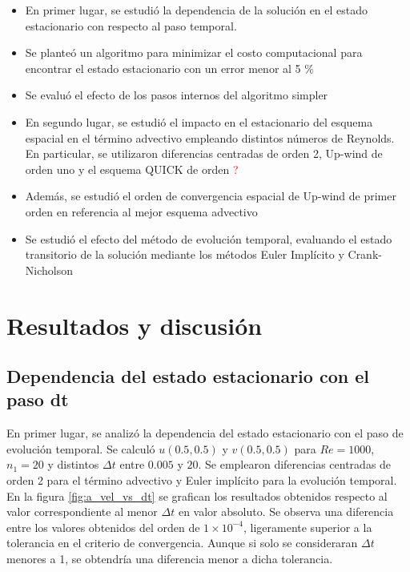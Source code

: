 \documentclass[aps,prb,twocolumn,superscriptaddress,floatfix,longbibliography,10pt]{revtex4-2}
\newif\ifptitle
\newif\ifpnumber
\newcounter{para}
\newcommand\ptitle[1]{\par\refstepcounter{para}
{\ifpnumber{\noindent\textcolor{lightgray}{\textbf{\thepara}}\indent}\fi}
{\ifptitle{\textbf{[{#1}]}}\fi}}
\begin{document}
\ptitle{Resumen de lo que se va a estudiar}
\begin{itemize}
  \item En primer lugar, se estudió la dependencia de la solución en el estado estacionario con respecto al paso temporal.
  \item Se planteó un algoritmo para minimizar el costo computacional para encontrar el estado estacionario con un error menor al 5 \%
  \item Se evaluó el efecto de los pasos internos del algoritmo simpler
  \item En segundo lugar, se estudió el impacto en el estacionario del esquema espacial en el término advectivo empleando distintos números de Reynolds. En particular, se utilizaron diferencias centradas de orden 2, Up-wind de orden uno y el esquema QUICK de orden \textcolor{red}{?}
  \item Además, se estudió el orden de convergencia espacial de Up-wind de primer orden en referencia al mejor esquema advectivo
  \item Se estudió el efecto del método de evolución temporal, evaluando el estado transitorio de la solución mediante los métodos Euler Implícito y Crank-Nicholson
\end{itemize}



\section{Resultados y discusión}


\subsection{Dependencia del estado estacionario con el paso dt}

En primer lugar, se analizó la dependencia del estado estacionario con el paso de evolución temporal. Se calculó $u(0.5,0.5)$ y $v(0.5,0.5)$ para $Re = 1000$, $n_1 = 20$ y distintos $\Delta t$ entre $0.005$ y $20$. Se emplearon diferencias centradas de orden 2 para el término advectivo y Euler implícito para la evolución temporal. En la figura \ref{fig:a_vel_vs_dt} se grafican los resultados obtenidos respecto al valor correspondiente al menor $\Delta t$ en valor absoluto. Se observa una diferencia entre los valores obtenidos del orden de $1 \times 10^{-4}$, ligeramente superior a la tolerancia en el criterio de convergencia. Aunque si solo se consideraran $\Delta t$ menores a 1, se obtendría una diferencia menor a dicha tolerancia.
\end{document}
